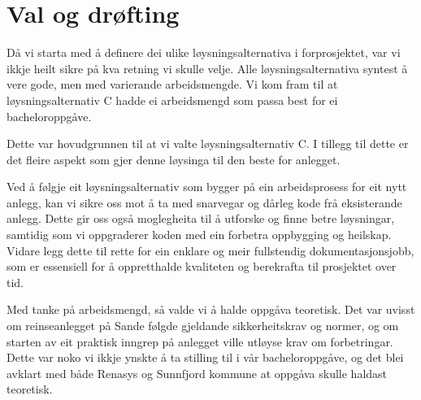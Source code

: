 \section{Val og drøfting}

Då vi starta med å definere dei ulike løysningsalternativa i forprosjektet, var vi
ikkje heilt sikre på kva retning vi skulle velje. Alle løysningsalternativa syntest å vere gode,
men med varierande arbeidsmengde. Vi kom fram til at løysningsalternativ C hadde ei arbeidsmengd
som passa best for ei bacheloroppgåve.

Dette var hovudgrunnen til at vi valte løysningsalternativ C.
I tillegg til dette er det fleire aspekt som gjer denne løysinga til den beste for anlegget.

Ved å følgje eit løysningsalternativ som bygger på ein arbeidsprosess for eit nytt anlegg, 
kan vi sikre oss mot å ta med snarvegar og dårleg kode frå eksisterande anlegg. 
Dette gir oss også moglegheita til å utforske og finne betre løysningar, 
samtidig som vi oppgraderer koden med ein forbetra oppbygging og heilskap.
Vidare legg dette til rette for ein enklare og meir fullstendig dokumentasjonsjobb, 
som er essensiell for å oppretthalde kvaliteten og berekrafta til prosjektet over tid.

Med tanke på arbeidsmengd, så valde vi å halde oppgåva teoretisk.
Det var uvisst om reinseanlegget på Sande følgde gjeldande sikkerheitskrav og normer,
og om starten av eit praktisk inngrep på anlegget ville utløyse krav om forbetringar.
Dette var noko vi ikkje ynskte å ta stilling til i vår bacheloroppgåve, og det blei avklart
med både Renasys og Sunnfjord kommune at oppgåva skulle haldast teoretisk.

